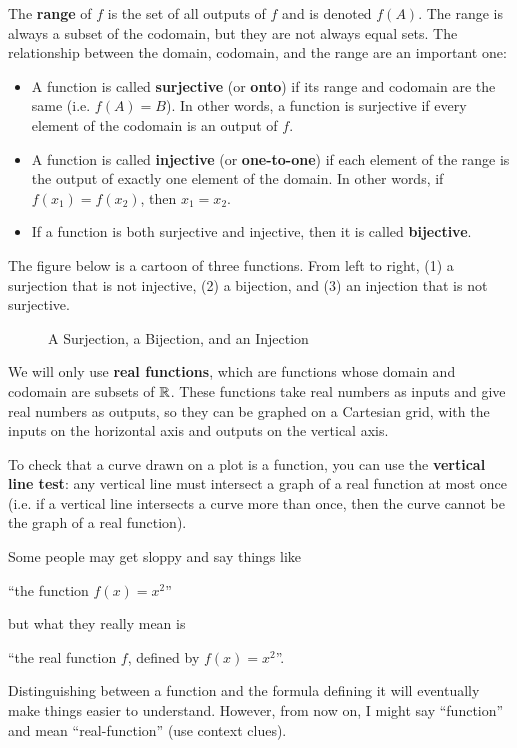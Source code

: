 The \textbf{range} of $f$ is the set of all outputs of $f$ and is denoted $f(A)$. The range is always a subset of the codomain, but they are not always equal sets. The relationship between the domain, codomain, and the range are an important one:
\begin{itemize}
\item A function is called \textbf{surjective} (or \textbf{onto}) if its range and codomain are the same (i.e. $f(A)=B$). In other words, a function is surjective if every element of the codomain is an output of $f$. 
\item A function is called \textbf{injective} (or \textbf{one-to-one}) if each element of the range is the output of exactly one element of the domain. In other words, if $f(x_1)=f(x_2)$, then $x_1=x_2$.
\item If a function is both surjective and injective, then it is called \textbf{bijective}.
\end{itemize}

The figure below is a cartoon of three functions. From left to right, (1) a surjection that is not injective, (2) a bijection, and (3) an injection that is not surjective.



\begin{figure}[H]
\centering

\caption{A Surjection, a Bijection, and an Injection}
\label{three-functions}
\end{figure}


We will only use \textbf{real functions}, which are functions whose domain and codomain are subsets of $\mathbb{R}$. These functions take real numbers as inputs and give real numbers as outputs, so they can be graphed on a Cartesian grid, with the inputs on the horizontal axis and outputs on the vertical axis.

To check that a curve drawn on a plot is a function, you can use the \textbf{vertical line test}:  any vertical line must intersect a graph of a real function at most once (i.e. if a vertical line intersects a curve more than once, then the curve cannot be the graph of a real function).


Some people may get sloppy and say things like
\begin{center}
``the function $f(x)=x^2$''
\end{center}
but what they really mean is
\begin{center}
``the real function $f$, defined by $f(x)=x^2$''.
\end{center}
Distinguishing between a function and the formula defining it will eventually make things easier to understand. However, from now on, I might say ``function'' and mean ``real-function'' (use context clues). 


